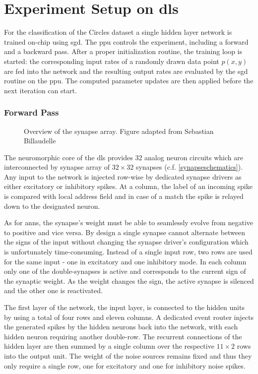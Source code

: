 \section{Experiment Setup on \gls{dls}}
\label{circlesimplementation}
For the classification of the Circles dataset a single hidden layer network is trained on-chip using \acrlong{sgd}. The \gls{ppu} controls the experiment, including a forward and a backward pass. After a proper initialization routine, the training loop is started: the corresponding input rates of a randomly drawn data point $p(x,y)$ are fed into the network and the resulting output rates are evaluated by the \gls{sgd} routine on the \gls{ppu}. The computed parameter updates are then applied before the next iteration can start.

\subsubsection*{Forward Pass}

\begin{wrapfigure}{R}{0.35\textwidth}
	\centering
	
	\caption[Overview of the synapse array.]{Overview of the synapse array. Figure adapted from Sebastian Billaudelle} 
	\label{synapsearraysketch}
\end{wrapfigure}
The neuromorphic core of the \gls{dls} provides 32 analog neuron circuits which are interconnected by synapse array of $32 \times 32$ synapses (c.f. \cref{synapseschematics}). Any input to the network is injected row-wise by dedicated synapse drivers as either excitatory or inhibitory spikes. At a column, the label of an incoming spike is compared with local address field and in case of a match the spike is relayed down to the designated neuron.

As for \glspl{ann}, the synapse's weight must be able to seamlessly evolve from negative to positive and vice versa. By design a single synapse cannot alternate between the signs of the input without changing the synapse driver's configuration which is unfortunately time-consuming. Instead of a single input row, two rows are used for the same input - one in excitatory and one inhibitory mode. In each column only one of the double-synapses is active and corresponds to the current sign of the synaptic weight. As the weight changes the sign, the active synapse is silenced and the other one is reactivated. 

The first layer of the network, the input layer, is connected to the hidden units by using a total of four rows and eleven columns. A dedicated event router injects the generated spikes by the hidden neurons back into the network, with each hidden neuron requiring another double-row. The recurrent connections of the hidden layer are then summed by a single column over the respective $11 \times 2$ rows into the output unit. The weight of the noise sources remains fixed and thus they only require a single row, one for excitatory and one for inhibitory noise spikes.

